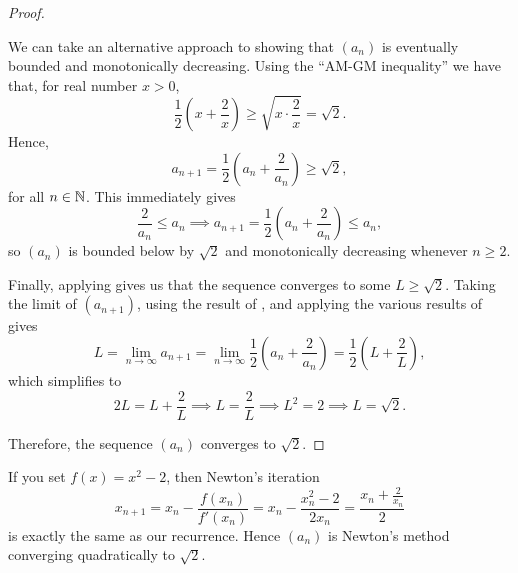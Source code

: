 \begin{problem}
\begin{proof}
    \begin{callout}
      We can take an alternative approach to showing that $(a_{n})$ is eventually bounded and monotonically decreasing.
      Using the ``AM-GM inequality''\footnotemark{} we have that, for real number $x > 0$,
        \[
          \frac{1}{2}\left( x + \frac{2}{x} \right) \geq \sqrt{x \cdot \frac{2}{x}} = \sqrt{2}.
        \]
      Hence,
      \[
        a_{n+1} = \frac{1}{2} \left( a_n + \frac{2}{a_n} \right) \geq \sqrt{2},
      \]
      for all $n \in \mathbb{N}$.
      This immediately gives
      \[
        \frac{2}{a_{n}} \leq a_n \implies a_{n+1} = \frac{1}{2} \left( a_n + \frac{2}{a_n} \right) \leq a_n,
      \]
      so $(a_{n})$ is bounded below by $\sqrt{2}$ and monotonically decreasing whenever $n \geq 2$.
    \end{callout}

    Finally, applying  gives us that the
    sequence converges to some $L \geq \sqrt{2}$. Taking the limit of $(a_{n+1})$,
    using the result of ,
    and applying the various results of
     gives
    \[
      L = \lim_{n \to \infty} a_{n+1} = \lim_{n \to \infty} \frac{1}{2} \left( a_n + \frac{2}{a_n} \right)
      = \frac{1}{2} \left( L + \frac{2}{L} \right),
    \]
    which simplifies to
    \[
      2L = L + \frac{2}{L} \implies L = \frac{2}{L} \implies L^2 = 2 \implies L = \sqrt{2}.
    \]

    Therefore, the sequence $(a_n)$ converges to $\sqrt{2}$.
  \end{proof}

  \begin{callout}
    If you set \(f(x)=x^2-2\), then Newton’s iteration
    \[
      x_{n+1}
      = x_n - \frac{f(x_n)}{f'(x_n)}
      = x_n - \frac{x_n^2 - 2}{2x_n}
      = \frac{x_n + \tfrac{2}{x_n}}{2}
    \]
    is exactly the same as our recurrence.  Hence $(a_n)$ is Newton’s method converging quadratically to $\sqrt2$.
  \end{callout}
\end{problem}
